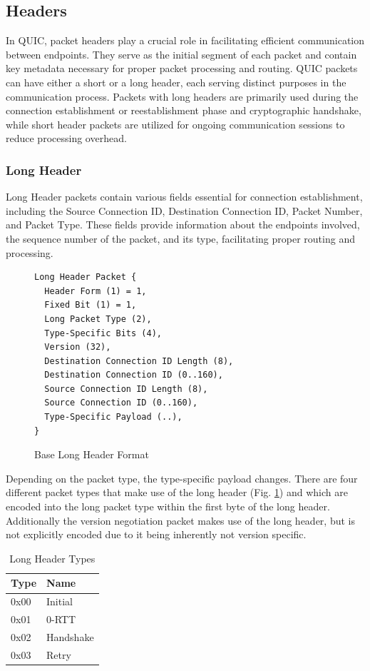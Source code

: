 \subsection{Headers} \label{headers}

In QUIC, packet headers play a crucial role in facilitating efficient communication between endpoints. They serve as the initial segment of each packet and contain key metadata necessary for proper packet processing and routing. QUIC packets can have either a short or a long header, each serving distinct purposes in the communication process. Packets with long headers are primarily used during the connection establishment or reestablishment phase and cryptographic handshake, while short header packets are utilized for ongoing communication sessions to reduce processing overhead.

\subsubsection{Long Header}

Long Header packets contain various fields essential for connection establishment, including the Source Connection ID, Destination Connection ID, Packet Number, and Packet Type. These fields provide information about the endpoints involved, the sequence number of the packet, and its type, facilitating proper routing and processing.

\begin{figure}[htb]
\begin{verbatim}
Long Header Packet {
  Header Form (1) = 1,
  Fixed Bit (1) = 1,
  Long Packet Type (2),
  Type-Specific Bits (4),
  Version (32),
  Destination Connection ID Length (8),
  Destination Connection ID (0..160),
  Source Connection ID Length (8),
  Source Connection ID (0..160),
  Type-Specific Payload (..),
}
\end{verbatim}
    \caption{Base Long Header Format\cite[88]{rfc9000}}
\end{figure}

Depending on the packet type, the type-specific payload changes. There are four different packet types that make use of the long header (Fig. \ref{table_long_header_types}) and which are encoded into the long packet type within the first byte of the long header. Additionally the version negotiation packet makes use of the long header, but is not explicitly encoded due to it being inherently not version specific.

\begin{table}[H]
\begin{center}
    \begin{tabular}{| l | l |}
    \hline
    Type & Name \\ \hline
    0x00 & Initial \\ \hline
    0x01 & 0-RTT \\ \hline
    0x02 & Handshake \\ \hline
    0x03 & Retry \\ \hline
    \end{tabular}
\end{center}
\caption{Long Header Types \cite[90]{rfc9000}}
\label{table_long_header_types}
\end{table}

